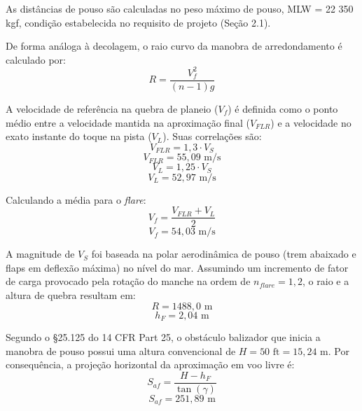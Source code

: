 As distâncias de pouso são calculadas no peso máximo de pouso, MLW = 22 350 kgf, condição estabelecida no requisito de projeto (Seção 2.1).

De forma análoga à decolagem, o raio curvo da manobra de arredondamento é calculado por:
\begin{equation}
    R = \frac{V_{f}^{2}}{(n - 1)g}
\end{equation}

A velocidade de referência na quebra de planeio ($V_{f}$) é definida como o ponto médio entre a velocidade mantida na aproximação final ($V_{FLR}$) e a velocidade no exato instante do toque na pista ($V_{L}$). Suas correlações são:
\begin{equation}
    V_{FLR} = 1{,}3 \cdot V_{S}
\end{equation}
\begin{equation}
    V_{FLR} = 55{,}09 \text{ m/s}
\end{equation}
\begin{equation}
    V_{L} = 1{,}25 \cdot V_{S}
\end{equation}
\begin{equation}
    V_{L} = 52{,}97 \text{ m/s}
\end{equation}

Calculando a média para o \textit{flare}:
\begin{equation}
    V_{f} = \frac{V_{FLR} + V_{L}}{2}
\end{equation}
\begin{equation}
    V_{f} = 54{,}03 \text{ m/s}
\end{equation}

A magnitude de $V_{S}$ foi baseada na polar aerodinâmica de pouso (trem abaixado e flaps em deflexão máxima) no nível do mar. Assumindo um incremento de fator de carga provocado pela rotação do manche na ordem de $n_{flare} = 1{,}2$, o raio e a altura de quebra resultam em:
\begin{equation}
    R = 1488{,}0 \text{ m}
\end{equation}
\begin{equation}
    h_{F} = 2{,}04 \text{ m}
\end{equation}

Segundo o \S 25.125 do 14 CFR Part 25, o obstáculo balizador que inicia a manobra de pouso possui uma altura convencional de $H = 50 \text{ ft} = 15,24 \text{ m}$. Por consequência, a projeção horizontal da aproximação em voo livre é:
\begin{equation}
    S_{af} = \frac{H - h_{F}}{\tan(\gamma)}
\end{equation}
\begin{equation}
    S_{af} = 251,89 \text{ m}
\end{equation}


